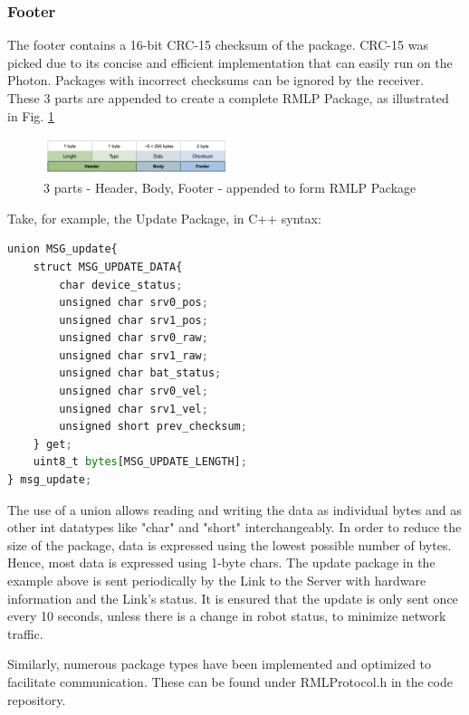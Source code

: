 \documentclass[letterpaper, 10 pt, conference]{ieeeconf}  %
\begin{document}
\subsubsection{Footer} The footer contains a 16-bit CRC-15 checksum of the package\cite{CRC_Ross}. CRC-15 was picked due to its concise and efficient implementation that can easily run on the Photon. Packages with incorrect checksums can be ignored by the receiver.
\\
These 3 parts are appended to create a complete RMLP Package, as illustrated in Fig. \ref{fig_packageFormat}

\begin{figure}[H]
\centering
\includegraphics[width=0.485\textwidth]{media/PackageFormat.png}
   \caption{\label{fig_packageFormat} 3 parts - Header, Body, Footer - appended to form RMLP Package}
\end{figure}

\noindent Take, for example, the Update Package, in C++ syntax:

\begin{lstlisting}[language=Python]
union MSG_update{
    struct MSG_UPDATE_DATA{
        char device_status;
        unsigned char srv0_pos;
        unsigned char srv1_pos;
        unsigned char srv0_raw;
        unsigned char srv1_raw;
        unsigned char bat_status;
        unsigned char srv0_vel;
        unsigned char srv1_vel;
        unsigned short prev_checksum;
    } get;
    uint8_t bytes[MSG_UPDATE_LENGTH];
} msg_update;
\end{lstlisting}

The use of a union allows reading and writing the data as individual bytes and as other int datatypes like "char" and "short" interchangeably. In order to reduce the size of the package, data is expressed using the lowest possible number of bytes. Hence, most data is expressed using 1-byte chars. The update package in the example above is sent periodically by the Link to the Server with hardware information and the Link's status. It is ensured that the update is only sent once every 10 seconds, unless there is a change in robot status, to minimize network traffic.

Similarly, numerous package types have been implemented and optimized to facilitate communication. These can be found under RMLProtocol.h in the code repository.
\\
\end{document}
